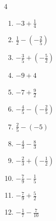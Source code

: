 \begin{multicols}{4}
\begin{enumerate}

  \item $\displaystyle -3 + \frac{1}{4}$


  \item $\displaystyle \frac{1}{2} - \left(-\frac{2}{5}\right)$


  \item $\displaystyle -\frac{3}{5} + \left(-\frac{5}{2}\right)$


  \item $\displaystyle -9 + 4$

        \phantom{$\displaystyle =-5$}

  \item $\displaystyle -7 + \frac{9}{2}$


  \item $\displaystyle -\frac{4}{5} - \left(-\frac{2}{5}\right)$


  \item $\displaystyle \frac{2}{5} - \left(-5\right)$


  \item $\displaystyle -\frac{4}{3} - \frac{8}{3}$

        \phantom{$\displaystyle =-4$}

\columnbreak %

  \item $\displaystyle -\frac{2}{3} + \left(-\frac{1}{2}\right)$


  \item $\displaystyle -\frac{7}{9} - \frac{1}{5}$


  \item $\displaystyle -\frac{7}{9} + \frac{5}{2}$


  \item $\displaystyle -\frac{1}{7} - \frac{7}{10}$


\end{enumerate}
\end{multicols}

